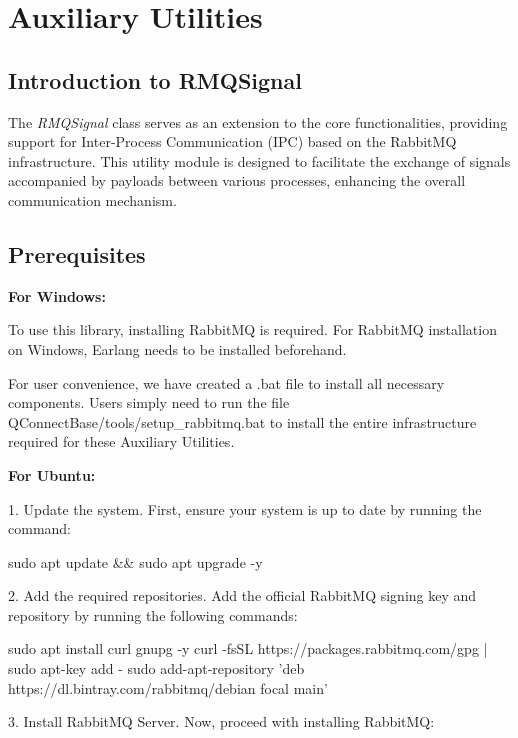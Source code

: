 \hypertarget{auxiliary-utilities}{%
\section{Auxiliary Utilities}\label{auxiliary-utilities}}
\subsection{Introduction to RMQSignal}
\label{subsec:auxiliary-intro}

The \emph{RMQSignal} class serves as an extension to the core functionalities, providing support for Inter-Process Communication (IPC) based on the RabbitMQ infrastructure. This utility module is designed to facilitate the exchange of signals accompanied by payloads between various processes, enhancing the overall communication mechanism.

\subsection{Prerequisites}
\label{subsubsec:prerequisites-details}

\textbf{For Windows:}

To use this library, installing RabbitMQ is required. For RabbitMQ installation on Windows, Earlang needs to be installed beforehand.

For user convenience, we have created a .bat file to install all necessary components. Users simply need to run the file QConnectBase/tools/setup\_rabbitmq.bat to install the entire infrastructure required for these Auxiliary Utilities.

\textbf{For Ubuntu:}

1. Update the system. First, ensure your system is up to date by running the command:

\begin{robotlog}
sudo apt update && sudo apt upgrade -y
\end{robotlog}

2. Add the required repositories. Add the official RabbitMQ signing key and repository by running the following commands:

\begin{robotlog}
sudo apt install curl gnupg -y
curl -fsSL https://packages.rabbitmq.com/gpg | sudo apt-key add -
sudo add-apt-repository 'deb https://dl.bintray.com/rabbitmq/debian focal main'
\end{robotlog}

3. Install RabbitMQ Server. Now, proceed with installing RabbitMQ:

